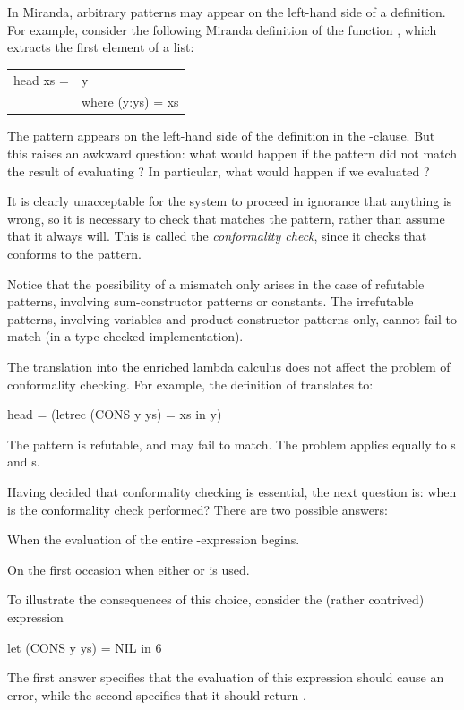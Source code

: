 {In Miranda, arbitrary patterns may appear on the left-hand side of a
definition. For example, consider the following Miranda definition of the
function , which extracts the first element of a list:
\begin{mlcoded}
	\begin{tabular}{ll}
		head xs = &y\\
		&where (y:ys) = xs
	\end{tabular}
\end{mlcoded}
The pattern  appears on the left-hand side of the definition in the
-clause. But this raises an awkward question: what would happen if the
pattern  did not match the result of evaluating ? In particular, what
would happen if we evaluated ?

It is clearly unacceptable for the system to proceed in ignorance that
anything is wrong, so it is necessary to check that  matches the pattern,
rather than assume that it always will. This is called the \textit{conformality check},
since it checks that  conforms to the pattern.

Notice that the possibility of a mismatch only arises in the case of refutable
patterns, involving sum-constructor patterns or constants. The irrefutable
patterns, involving variables and product-constructor patterns only, cannot
fail to match (in a type-checked implementation).

The translation into the enriched lambda calculus does not affect the
problem of conformality checking. For example, the definition of 
translates to:
\begin{mlcoded}
head = (letrec (CONS y ys) = xs in y)
\end{mlcoded}
The pattern  is refutable, and may fail to match. The problem
applies equally to s and s.

Having decided that conformality checking is essential, the next question
is: when is the conformality check performed? There are two possible
answers:
\begin{numbered}
	\item When the evaluation of the entire -expression begins.
	\item On the first occasion when either  or  is used.
\end{numbered}
To illustrate the consequences of this choice, consider the (rather
contrived) expression
\begin{mlcoded}
let (CONS y ys) = NIL in 6
\end{mlcoded}
The first answer specifies that the evaluation of this expression should cause
an error, while the second specifies that it should return .

}
